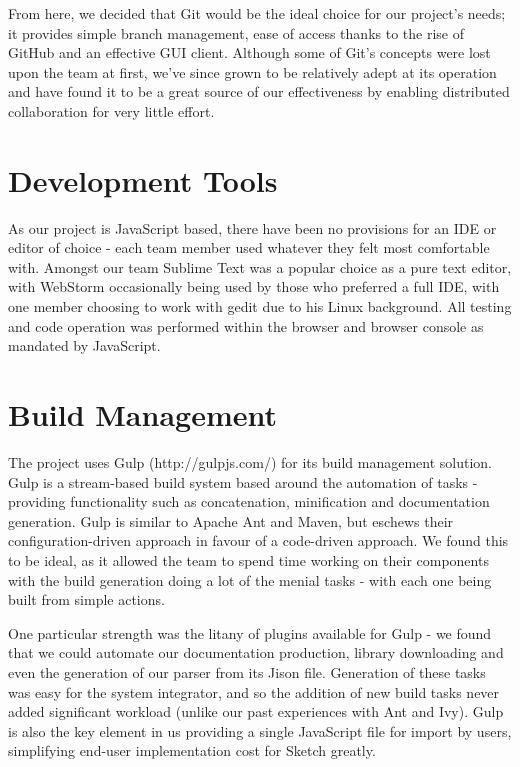 \documentclass{l3proj}
\begin{document}
From here, we decided that Git would be the ideal choice for our project's needs; it provides simple branch management, ease of access thanks to the rise of GitHub and an effective GUI client. Although some of Git's concepts were lost upon the team at first, we've since grown to be relatively adept at its operation and have found it to be a great source of our effectiveness by enabling distributed collaboration for very little effort.

\section{Development Tools}
\label{dev-tools}
As our project is JavaScript based, there have been no provisions for an IDE or editor of choice - each team member used whatever they felt most comfortable with. Amongst our team Sublime Text was a popular choice as a pure text editor, with WebStorm occasionally being used by those who preferred a full IDE, with one member choosing to work with gedit due to his Linux background. All testing and code operation was performed within the browser and browser console as mandated by JavaScript.

\section{Build Management}
\label{dev-build}
The project uses Gulp (http://gulpjs.com/) for its build management solution. Gulp is a stream-based build system based around the automation of tasks - providing functionality such as concatenation, minification and documentation generation. Gulp is similar to Apache Ant and Maven, but eschews their configuration-driven approach in favour of a code-driven approach. We found this to be ideal, as it allowed the team to spend time working on their components with the build generation doing a lot of the menial tasks - with each one being built from simple actions.

One particular strength was the litany of plugins available for Gulp - we found that we could automate our documentation production, library downloading and even the generation of our parser from its Jison file. Generation of these tasks was easy for the system integrator, and so the addition of new build tasks never added significant workload (unlike our past experiences with Ant and Ivy). Gulp is also the key element in us providing a single JavaScript file for import by users, simplifying end-user implementation cost for Sketch greatly.
\end{document}
